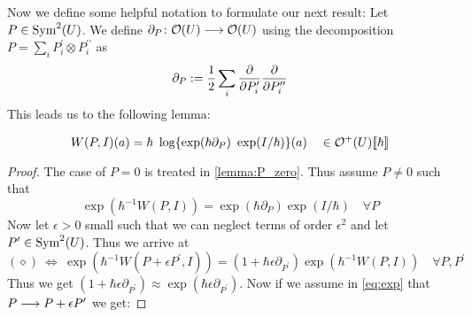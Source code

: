Now we define some helpful notation to formulate our next result: Let $P \in \operatorname{Sym}^2(U)$. We define $\partial_P \colon \mathcal{O}(U) \longrightarrow \mathcal{O}(U)$ using the decomposition $P = \sum_i P_i^\prime \otimes P^{\prime\prime}_i$ as
\begin{equation} \partial_P := \frac{1}{2} \sum_i \frac{\partial }{\partial P_i^\prime} \frac{\partial }{\partial P^{\prime\prime}_i}\end{equation}
This leads us to the following lemma:

\begin{lem}
\label{lemma:WPI}
  \begin{equation}W(P,I)(a) = \hbar \ \log\{ \exp(\hbar \partial_P) \ \exp(I/\hbar) \} (a) \quad \in \mathcal{O}^+(U)\llbracket \hbar \rrbracket\end{equation}
\begin{proof}
  The case of $P=0$ is treated in \ref{lemma:P_zero}. Thus assume $P \neq 0$ such that
  \begin{equation}
  \label{eq:exp} \tag{$\diamond$}
    \exp( \hbar^{-1} W(P,I)) = \exp(\hbar \partial_P) \exp(I/\hbar) \quad \forall P
  \end{equation}
  Now let $\epsilon > 0$ small such that we can neglect terms of order $\epsilon^2$ and let $P^\prime \in \operatorname{Sym}^2(U)$. Thus we arrive at
  \begin{equation}
  \label{eq:exp2} \tag{$\diamond \diamond$}
    (\diamond) \ \Leftrightarrow \ \exp( \hbar^{-1} W(P+ \epsilon P^\prime,I)) = (1+ \hbar \epsilon \partial_{P^\prime}) \exp( \hbar^{-1} W(P,I)) \quad \forall P,P^\prime
  \end{equation}
  Thus we get $(1+\hbar \epsilon \partial_{P^\prime}) \approx \exp(\hbar \epsilon \partial_{P^\prime})$. Now if we assume in \eqref{eq:exp} that $P \lra P + \epsilon P^\prime$ we get:



\end{proof}
\end{lem}
